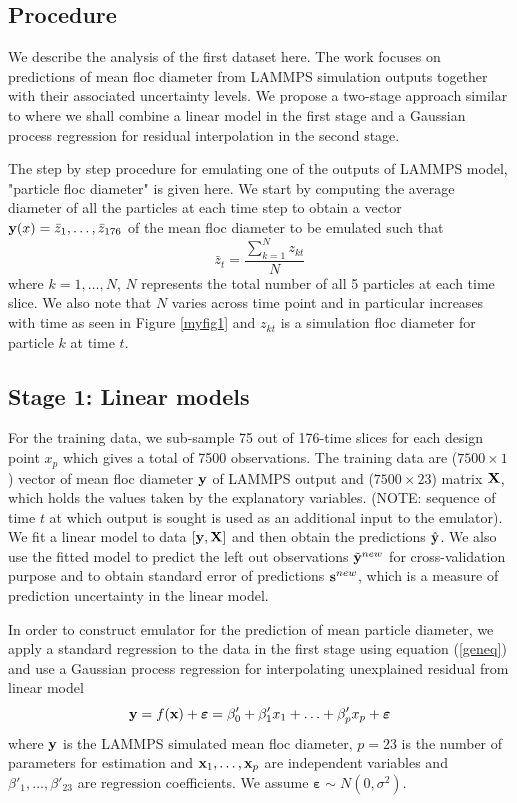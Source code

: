\documentclass[12pt,titlepage]{report}
\newcommand{\bx}{{\bf x}}
\newcommand{\bX}{{\bf X}}
\newcommand{\by}{{\bf y}}
\newcommand{\tby}{{\tilde {\bf y}}}
\newcommand{\hby}{{\hat {\bf y}}}
\newcommand{\bs}{{\bf s}}
\theoremstyle{definition}
\theoremstyle{remark}
\begin{document}
\subsection{Procedure}
We describe the analysis of the first dataset here.
The work focuses on predictions of mean floc diameter from LAMMPS simulation outputs together with their associated uncertainty levels. We propose a two-stage approach similar to \citet{pd11} where we shall combine a linear model in the first stage and a Gaussian process regression for residual interpolation in the second stage.

The step by step procedure for emulating one of the outputs of LAMMPS model, "particle floc diameter" is given here. We start by computing the average diameter of all the particles at each time step to obtain a vector $\by(x)=\bar z_1,\ldots,\bar z_{176}$ of the mean floc diameter to be emulated such that
\begin{equation}
\bar z_t=\frac{\sum^N_{k=1} z_{kt}}{N}
\end{equation}
where $k=1,\ldots, N$, $N$ represents the total number of all 5 particles at each time slice. We also note that $N$ varies across time point and in particular increases with time as seen in Figure \ref{myfig1} and $z_{kt}$ is a simulation floc diameter for particle $k$ at time $t$.

\subsection{Stage 1: Linear models}
For the training data, we sub-sample 75 out of 176-time slices for each design point $x_p$ which gives a total of 7500 observations.
The training data are ($7500 \times 1$) vector of mean floc diameter $\by$ of LAMMPS output and ($7500 \times 23$) matrix $\bX$, which holds the values taken by the explanatory variables. (NOTE: sequence of time $t$ at which output is sought is used as an additional input to the emulator). We fit a linear model to data $[\by,\bX]$ and then obtain the predictions $\hby$.
We also use the fitted model to predict the left out observations $\tby^{new}$ for cross-validation purpose and to obtain standard error of predictions $\bs^{new}$, which is a measure of prediction uncertainty in the linear model. 

In order to construct emulator for the prediction of mean particle diameter, we apply a standard regression to the data in the first stage using equation (\ref{geneq}) and use a Gaussian process regression for interpolating unexplained residual from linear model
\begin{equation}\label{geneq}
\by=f(\textbf{\bx})+\boldsymbol\varepsilon= \beta'_0+\beta'_{1}x_{1}+\ldots +\beta'_{p}x_{p}+\boldsymbol\varepsilon
\end{equation}
where $\by$ is the LAMMPS simulated mean floc diameter, $p=23$ is the number of parameters for estimation and $\bx_1,\ldots,\bx_p$ are independent variables and $\beta'_1,\ldots,\beta'_{23}$ are regression coefficients. We assume $\boldsymbol \varepsilon \sim N(0, \sigma^2)$. 
\end{document}
